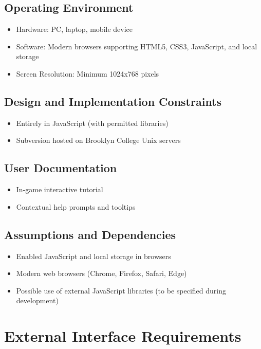 \documentclass{scrreprt}
\begin{document}
\section{Operating Environment}
\begin{itemize}
    \item Hardware: PC, laptop, mobile device
    \item Software: Modern browsers supporting HTML5, CSS3, JavaScript, and local storage
    \item Screen Resolution: Minimum 1024x768 pixels
\end{itemize}

\section{Design and Implementation Constraints}
\begin{itemize}
    \item Entirely in JavaScript (with permitted libraries)
    \item Subversion hosted on Brooklyn College Unix servers
\end{itemize}

\section{User Documentation}
\begin{itemize}
    \item In-game interactive tutorial
    \item Contextual help prompts and tooltips
\end{itemize}

\section{Assumptions and Dependencies}
\begin{itemize}
    \item Enabled JavaScript and local storage in browsers
    \item Modern web browsers (Chrome, Firefox, Safari, Edge)
    \item Possible use of external JavaScript libraries (to be specified during development)
\end{itemize}

\chapter{External Interface Requirements}
\end{document}
